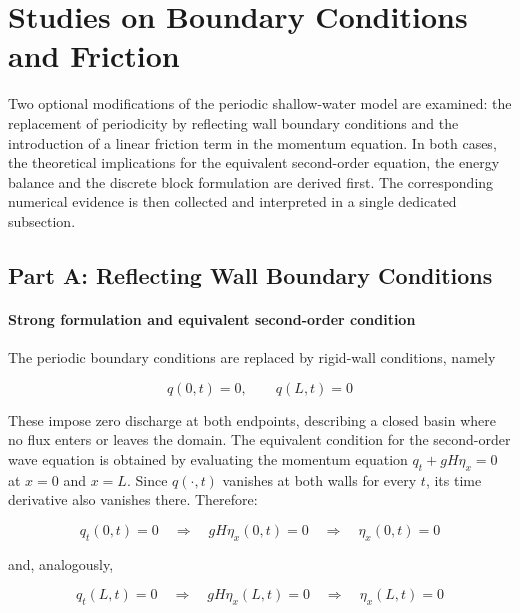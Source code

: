 
\section{Studies on Boundary Conditions and Friction}
\label{sc:25}

Two optional modifications of the periodic shallow-water model are examined: the replacement of periodicity by reflecting wall boundary conditions and the introduction of a linear friction term in the momentum equation. In both cases, the theoretical implications for the equivalent second-order equation, the energy balance and the discrete block formulation are derived first. The corresponding numerical evidence is then collected and interpreted in a single dedicated subsection.

\subsection{Part A: Reflecting Wall Boundary Conditions}
\label{ssc:251}

\paragraph{Strong formulation and equivalent second-order condition}
The periodic boundary conditions are replaced by rigid-wall conditions, namely

\begin{equation}
q(0,t)=0, \qquad q(L,t)=0
\label{eq:reflecting_bc_hw2}
\end{equation}

These impose zero discharge at both endpoints, describing a closed basin where no flux enters or leaves the domain. The equivalent condition for the second-order wave equation is obtained by evaluating the momentum equation \(q_t + gH\eta_x = 0\) at \(x=0\) and \(x=L\). Since \(q(\cdot,t)\) vanishes at both walls for every \(t\), its time derivative also vanishes there. Therefore:

\begin{equation}
q_t(0,t)=0 \quad\Longrightarrow\quad gH\eta_x(0,t)=0 \quad\Longrightarrow\quad \eta_x(0,t)=0
\label{eq:neumann_left_wall}
\end{equation}

and, analogously,

\begin{equation}
q_t(L,t)=0 \quad\Longrightarrow\quad gH\eta_x(L,t)=0 \quad\Longrightarrow\quad \eta_x(L,t)=0
\label{eq:neumann_right_wall}
\end{equation}

